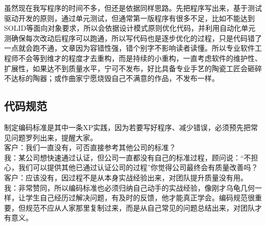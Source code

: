 虽然现在我写程序的时间不多，但还是依据同样思路。先把程序写出来，基于测试驱动开发的原则，通过单元测试，但通常第一版程序有很多不足，比如不能达到SOLID等面向对象要求，所以会依据设计模式原则优化代码，并利用自动化单元测确保每次改动后程序可以跑通，所以写代码也是逐步优化的过程，只是代码错了一点就会跑不通，文章因为容错性强，错个别字不影响读者读懂。所以专业软件工程师不会等到维才的程度才去重构，而是持续的小重构，一直考虑软件的维护性、扩展性，如果达不到质量水平，宁可不发布，好比具备专业手艺的陶瓷工匠会砸碎不达标的陶器；或作曲家宁愿烧毁自己不满意的作品，不发布一样。


\hypertarget{ux4ee3ux7801ux89c4ux8303}{%
\subsection{代码规范}\label{ux4ee3ux7801ux89c4ux8303}}

制定编码标准是其中一条XP实践，因为若要写好程序、减少错误，必须预先把常见问题罗列出来，提醒大家。\\
客户：我们一直没有，可否直接参考其他公司的标准？\\
我：某公司想快速通过认证，但公司一直都没有自己的标准过程，顾问说：``不担心，我们可以提供其他已通过认证公司的过程''你觉得公司最终会有质量改善吗？\\
客户：应该没有，因过程不是从本身实战经验出来，对团队提升质量没有用。\\
我：非常赞同，所以编码标准也必须归纳自己动手的实战经验，像刚才乌龟几何一样，让学生自己经历过解决问题，有及时的反馈，他才能真正学会。编码规范很重要，但规范不应从人家那里复制过来，而是从自己常见的问题总结出来，对团队才有意义。\\

